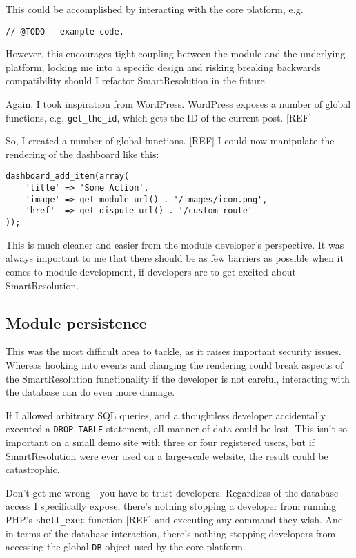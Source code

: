 This could be accomplished by interacting with the core platform, e.g.

\begin{lstlisting}
// @TODO - example code.
\end{lstlisting}

However, this encourages tight coupling between the module and the underlying platform, locking me into a specific design and risking breaking backwards compatibility should I refactor SmartResolution in the future.

Again, I took inspiration from WordPress. WordPress exposes a number of global functions, e.g. \lstinline{get_the_id}, which gets the ID of the current post. [REF] %

So, I created a number of global functions. [REF] I could now manipulate the rendering of the dashboard like this: %

\begin{lstlisting}
dashboard_add_item(array(
    'title' => 'Some Action',
    'image' => get_module_url() . '/images/icon.png',
    'href'  => get_dispute_url() . '/custom-route'
));
\end{lstlisting}

This is much cleaner and easier from the module developer's perspective. It was always important to me that there should be as few barriers as possible when it comes to module development, if developers are to get excited about SmartResolution.

\subsection{Module persistence}

This was the most difficult area to tackle, as it raises important security issues. Whereas hooking into events and changing the rendering could break aspects of the SmartResolution functionality if the developer is not careful, interacting with the database can do even more damage.

If I allowed arbitrary SQL queries, and a thoughtless developer accidentally executed a \lstinline{DROP TABLE} statement, all manner of data could be lost. This isn't so important on a small demo site with three or four registered users, but if SmartResolution were ever used on a large-scale website, the result could be catastrophic.

Don't get me wrong - you have to trust developers. Regardless of the database access I specifically expose, there's nothing stopping a developer from running PHP's \lstinline{shell_exec} function [REF] and executing any command they wish. And in terms of the database interaction, there's nothing stopping developers from accessing the global \lstinline{DB} object used by the core platform.

